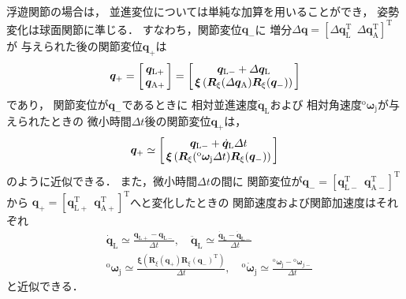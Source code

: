 ﻿\documentclass[a4paper]{jsarticle}
\begin{document}
浮遊関節の場合は，
並進変位については単純な加算を用いることができ，
姿勢変化は球面関節に準じる．
すなわち，関節変位$\bm{q}_{-}$に
増分$\varDelta\bm{q}=[\varDelta\bm{q}_{\mathrm{L}}^{\mathrm{T}}~~\varDelta\bm{q}_{\mathrm{A}}^{\mathrm{T}}]^{\mathrm{T}}$が
与えられた後の関節変位$\bm{q}_{+}$は
\begin{align*}
\bm{q}_{+}
=\left[\begin{array}{@{\,}c@{\,}}
 \bm{q}_{\mathrm{L}+} \\ \bm{q}_{\mathrm{A}+}
\end{array}\right]
=\left[\begin{array}{@{\,}c@{\,}}
 \bm{q}_{\mathrm{L}-}+\varDelta\bm{q}_{\mathrm{L}} \\
 \bm{\xi}\left(\bm{R}_{\xi}(\varDelta\bm{q}_{\mathrm{A}})\bm{R}_{\xi}(\bm{q}_{-})\right)
\end{array}\right]
\end{align*}
であり，
関節変位が$\bm{q}_{-}$であるときに
相対並進速度$\dot{\bm{q}}_{\mathrm{L}}$および
相対角速度${}^{\mathrm{o}}\bm{\omega}_{\mathrm{j}}$が与えられたときの
微小時間$\varDelta t$後の関節変位$\bm{q}_{+}$は，
\begin{align*}
\bm{q}_{+}
\simeq\left[\begin{array}{@{\,}c@{\,}}
 \bm{q}_{\mathrm{L}-}+\dot{\bm{q}}_{\mathrm{L}}\varDelta t \\
 \bm{\xi}\left(\bm{R}_{\xi}({}^{\mathrm{o}}\bm{\omega}_{\mathrm{j}}\varDelta t)\bm{R}_{\xi}(\bm{q}_{-})\right)
\end{array}\right]
\end{align*}
のように近似できる．
また，微小時間$\varDelta t$の間に
関節変位が$\bm{q}_{-}=[\bm{q}_{\mathrm{L}-}^{\mathrm{T}}~~\bm{q}_{\mathrm{A}-}^{\mathrm{T}}]^{\mathrm{T}}$から
$\bm{q}_{+}=[\bm{q}_{\mathrm{L}+}^{\mathrm{T}}~~\bm{q}_{\mathrm{A}+}^{\mathrm{T}}]^{\mathrm{T}}$へと変化したときの
関節速度および関節加速度はそれぞれ
\begin{align*}
&\dot{\bm{q}}_{\mathrm{L}}\simeq\frac{\bm{q}_{\mathrm{L}+}-\bm{q}_{\mathrm{L}-}}{\varDelta t},\quad
\ddot{\bm{q}}_{\mathrm{L}}\simeq\frac{\dot{\bm{q}}_{\mathrm{L}}-\dot{\bm{q}}_{\mathrm{L}-}}{\varDelta t}
\\
&
{}^{\mathrm{o}}\bm{\omega}_{\mathrm{j}}\simeq
\frac{\bm{\xi}\left(\bm{R}_{\xi}(\bm{q}_{+})\bm{R}_{\xi}(\bm{q}_{-})^{\mathrm{T}}\right)}
     {\varDelta t},\quad
{}^{\mathrm{o}}\dot{\bm{\omega}}_{\mathrm{j}}\simeq
\frac{{}^{\mathrm{o}}\bm{\omega}_{\mathrm{j}}-{}^{\mathrm{o}}\bm{\omega}_{j-}}{\varDelta t}
\end{align*}
と近似できる．
\end{document}
